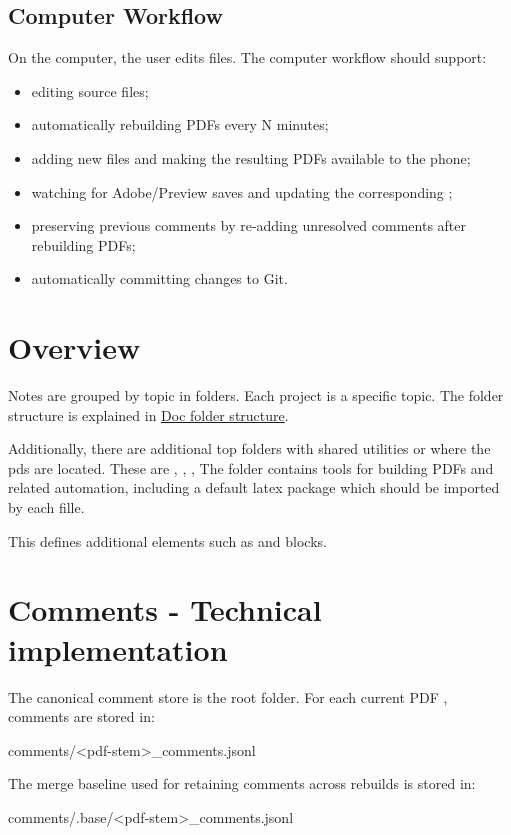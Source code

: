 \subsection*{Computer Workflow}
On the computer, the user edits  files.
The computer workflow should support:
\begin{itemize}
  \item editing  source files;
  \item automatically rebuilding PDFs every N minutes;
  \item adding new  files and making the resulting PDFs available to the phone;
  \item watching  for Adobe/Preview saves and updating the corresponding ;
  \item preserving previous comments by re-adding unresolved comments after rebuilding PDFs;
  \item automatically committing changes to Git.
\end{itemize}


\section*{Overview}
Notes are grouped by topic in folders.
Each  project is a specific topic. 
The folder structure is explained in \hyperref[sec:doc-folder-structure]{Doc folder structure}.

Additionally, there are additional top folders with shared utilities or where the pds are located. 
These are , , ,  
The  folder contains tools for building PDFs and related automation, including a default latex package  which should be imported by each  fille.

This defines additional elements such as  and  blocks.


\section*{Comments - Technical implementation}
The canonical comment store is the root  folder.
For each current PDF , comments are stored in:
\begin{DocCode}
  comments/<pdf-stem>_comments.jsonl
\end{DocCode}
The merge baseline used for retaining comments across rebuilds is stored in:
\begin{DocCode}
  comments/.base/<pdf-stem>_comments.jsonl
\end{DocCode}


